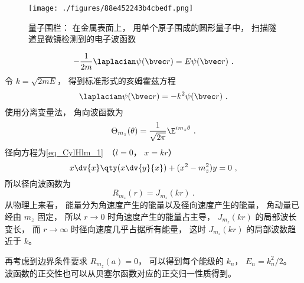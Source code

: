 
\begin{issues}
\issueDraft
\end{issues}


\begin{figure}[ht]
\centering
\texttt{[image: ./figures/88e452243b4cbedf.png]}
\caption{量子围栏： 在金属表面上， 用单个原子围成的圆形量子中， 扫描隧道显微镜检测到的电子波函数} \label{fig_CirISW_1}
\end{figure}

\begin{equation}
-\frac{1}{2m}\laplacian \psi(\bvec r) = E\psi(\bvec r)~.
\end{equation}
令 $k = \sqrt{2mE}$， 得到标准形式的亥姆霍兹方程
\begin{equation}
\laplacian \psi(\bvec r) = -k^2\psi(\bvec r)~.
\end{equation}
使用分离变量法， 角向波函数为
\begin{equation}
\Theta_{m_z}(\theta) = \frac{1}{\sqrt{2\pi}} \E^{im_z \theta}~.
\end{equation}
径向方程为\autoref{eq_CylHlm_1}~（$l = 0$， $x = kr$）
\begin{equation}
x \dv{x} \qty(x\dv{y}{x}) + (x^2 - m_z^2)y = 0~,
\end{equation}
所以径向波函数为
\begin{equation}
R_{m_z}(r) = J_{m_z}(kr)~.
\end{equation}
从物理上来看， 能量分为角速度产生的能量以及径向速度产生的能量， 角动量已经由 $m_z$ 固定， 所以 $r \to 0$ 时角速度产生的能量占主导， $J_{m_z}(kr)$ 的局部波长变长， 而 $r\to \infty$ 时径向速度几乎占据所有能量， 这时 $J_{m_z}(kr)$ 的局部波数趋近于 $k$。

再考虑到边界条件要求 $R_{m_z}(a)  = 0$， 可以得到每个能级的 $k_n$， $E_n = k_n^2/2$。 波函数的正交性也可以从贝塞尔函数对应的正交归一性质得到。
